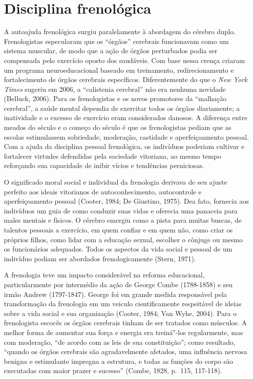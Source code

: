 \chapter{Disciplina frenológica}

A autoajuda frenológica surgiu paralelamente à abordagem do cérebro
duplo. Frenologistas especularam que os ``órgãos'' cerebrais funcionavam
como um sistema muscular, de modo que a ação de órgãos perturbados podia
ser compensada pelo exercício oposto dos saudáveis. Com base nessa
crença criaram um programa neuroeducacional baseado em treinamento,
redirecionamento e fortalecimento de órgãos cerebrais específicos.
Diferentemente do que o \emph{New York Times} sugeriu em 2006, a
``calistenia cerebral'' não era nenhuma novidade (Belluck, 2006). Para
os frenologistas e os novos promotores da ``malhação cerebral'', a saúde
mental dependia de exercitar todos os órgãos diariamente; a inatividade
e o excesso de exercício eram considerados danosos. A diferença entre
meados do século  e o começo do século  é que os frenologistas
pediam que as escolas estimulassem sobriedade, moderação, castidade e
aperfeiçoamento pessoal. Com a ajuda da disciplina pessoal frenológica,
os indivíduos poderiam cultivar e fortalecer virtudes defendidas pela
sociedade vitoriana, ao mesmo tempo reforçando sua capacidade de inibir
vícios e tendências perniciosas.

O significado moral social e individual da frenologia derivava de seu
ajuste perfeito aos ideais vitorianos de autoconhecimento, autocontrole
e aperfeiçoamento pessoal (Cooter, 1984; De Giustino, 1975). Dea fato,
fornecia aos indivíduos um guia de como conduzir suas vidas e oferecia
uma panaceia para males mentais e físicos. O cérebro emergiu como a
pista para muitas buscas, de talentos pessoais a exercício, em quem
confiar e em quem não, como criar os próprios filhos, como lidar com a
educação sexual, escolher o cônjuge ou mesmo os funcionários adequados.
Todos os aspectos da vida social e pessoal de um indivíduo podiam ser
abordados frenologicamente (Stern, 1971).

A frenologia teve um impacto considerável na reforma educacional,
particularmente por intermédio da ação de George Combe (1788-1858) e seu
irmão Andrew (1797-1847). George foi em grande medida responsável pela
transformação da frenologia em um veiculo cientificamente respeitável de
ideias sobre a vida social e sua organização (Cooter, 1984; Van Wyhe,
2004). Para o frenologista escocês os órgãos cerebrais tinham de ser
tratados como músculos. A melhor forma de aumentar sua força e energia
era treiná"-los regularmente, mas com moderação, ``de acordo com as leis
de sua constituição''; como resultado, ``quando os órgãos cerebrais são
agradavelmente afetados, uma influência nervosa benigna e estimulante
impregna a estrutura, e todas as funções do corpo são executadas com
maior prazer e sucesso'' (Combe, 1828, p.~115, 117-118).


